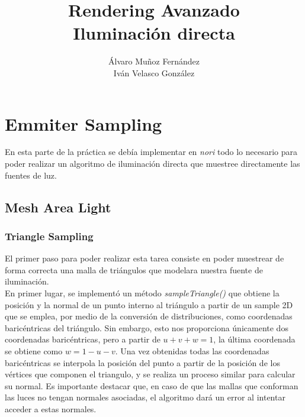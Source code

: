 \documentclass[10pt,oneside,a4paper]{article}
\begin{document}
\begin{titlepage}

\title{\Huge Rendering Avanzado  \\[0.7in] \LARGE Iluminación directa\\[3.6in]}
\date{}
\author{Álvaro Muñoz Fernández\\
Iván Velasco González}
\maketitle
\thispagestyle{empty}
\end{titlepage}

\section{Emmiter Sampling}
En esta parte de la práctica se debía implementar en \textit{nori} todo lo necesario para poder realizar un algoritmo de iluminación directa que muestree directamente las fuentes de luz.
\subsection{Mesh Area Light}
\subsubsection{Triangle Sampling}
El primer paso para poder realizar esta tarea consiste en poder muestrear de forma correcta una malla de triángulos que modelara nuestra fuente de iluminación.\\

En primer lugar, se implementó un método \textit{sampleTriangle()} que obtiene la posición y la normal de un punto interno al triángulo a partir de un sample 2D que se emplea, por medio de la conversión de distribuciones, como coordenadas baricéntricas del triángulo. Sin embargo, esto nos proporciona únicamente dos coordenadas baricéntricas, pero a partir de $ u + v + w = 1$, la última coordenada se obtiene como $ w = 1 - u - v$. Una vez obtenidas todas las coordenadas baricéntricas se interpola la posición del punto a partir de la posición de los vértices que componen el triangulo, y se realiza un proceso similar para calcular su normal. Es importante destacar que, en caso de que las mallas que conforman las luces no tengan normales asociadas, el algoritmo dará un error al intentar acceder a estas normales.\\
\end{document}
